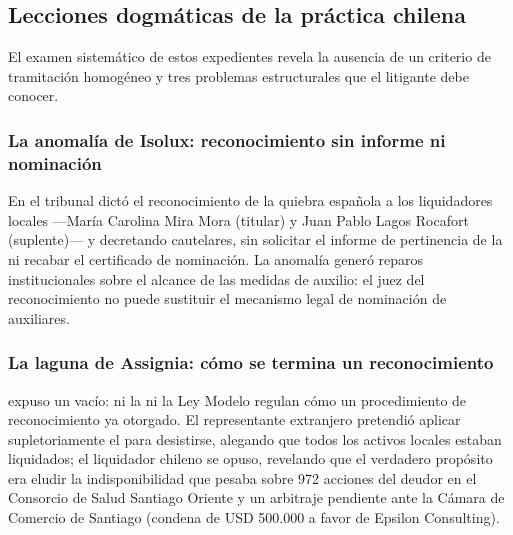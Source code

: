 
\bloqueJurisprudencial

\subsection{Lecciones dogmáticas de la práctica chilena}

El examen sistemático de estos expedientes revela la ausencia de un criterio de tramitación
homogéneo y tres problemas estructurales que el litigante debe conocer.

\subsubsection{La anomalía de Isolux: reconocimiento sin informe ni nominación}

En  el tribunal dictó el reconocimiento de la quiebra
española  a los liquidadores locales ---María Carolina Mira
Mora (titular) y Juan Pablo Lagos Rocafort (suplente)--- y decretando cautelares, sin solicitar
el informe de pertinencia de la \superir{} ni recabar el certificado de nominación. La anomalía
generó reparos institucionales sobre el alcance de las medidas de auxilio: el juez del
reconocimiento no puede sustituir el mecanismo legal de nominación de auxiliares.

\subsubsection{La laguna de Assignia: cómo se termina un reconocimiento}

 expuso un vacío: ni la \LIR{} ni la Ley Modelo
regulan cómo  un procedimiento de reconocimiento ya otorgado. El
representante extranjero pretendió aplicar supletoriamente el \cpc{} para desistirse, alegando
que todos los activos locales estaban liquidados; el liquidador chileno se opuso, revelando que
el verdadero propósito era eludir la indisponibilidad que pesaba sobre 972 acciones del deudor
en el Consorcio de Salud Santiago Oriente y un arbitraje pendiente ante la Cámara de Comercio de
Santiago (condena de USD 500.000 a favor de Epsilon Consulting).

